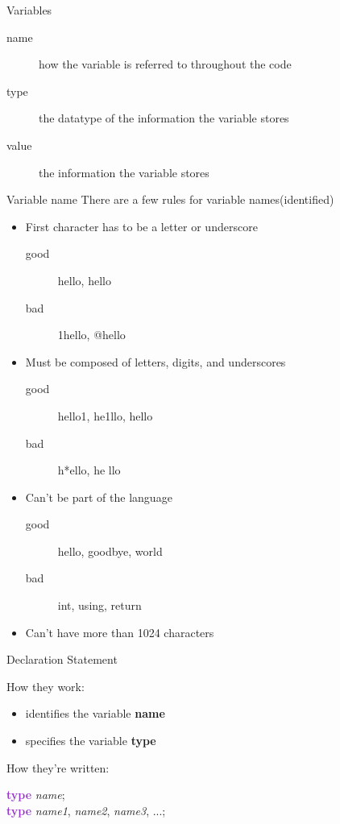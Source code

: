 \documentclass[xcolor={dvipsnames}]{beamer}
\begin{document}
\begin{frame}{Variables}
	\begin{description}
		\item[name] how the variable is referred to throughout the code
		\pause
		\item[type] the datatype of the information the variable stores
		\pause
		\item[value] the information the variable stores
	\end{description}
\end{frame}

\begin{frame}{Variable name}
	There are a few rules for variable names(identified)
	\begin{itemize}
		\pause
		\item First character has to be a letter or underscore
			\begin{description}
				\item[good] hello, \textunderscore hello
				\item[bad] 1hello, @hello
			\end{description}
		\pause
		\item Must be composed of letters, digits, and underscores
			\begin{description}
				\item[good] hello1, he1llo, he\textunderscore llo
				\item[bad] h*ello, he llo
			\end{description}
		\pause
		\item Can't be part of the language
				\begin{description}
				\item[good] hello, goodbye, world
				\item[bad] int, using, return
			\end{description}
		\pause
		\item Can't have more than 1024 characters 
	\end{itemize}	
\end{frame}

\begin{frame}{Declaration Statement}
	\begin{block}{How they work:}
		\begin{itemize}
			\item identifies the variable \textbf{name}
			\item specifies the variable \textbf{type}
		\end{itemize}
	\end{block}
	\pause
	\begin{block}{How they're written:}
		\begin{center}
			\textcolor{DarkOrchid}{\textbf{type}} \textit{name};\\
			\pause
			\textcolor{DarkOrchid}{\textbf{type}} \textit{name1}, \textit{name2}, \textit{name3}, ...;
		\end{center}
	\end{block}
\end{frame}
\end{document}
